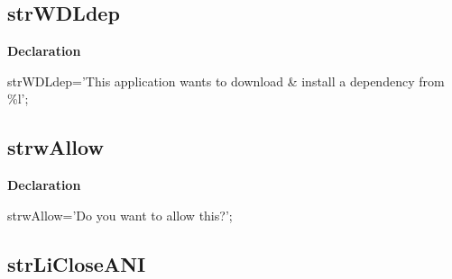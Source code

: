 \documentclass{report}
\newif\ifpdf
\begin{document}
\subsection*{strWDLdep}
\fi
\label{trstrings-strWDLdep}
\begin{list}{}{
\setlength{\itemindent}{0cm}
\setlength{\listparindent}{0cm}
\setlength{\leftmargin}{\evensidemargin}
\addtolength{\leftmargin}{\tmplength}
\settowidth{\labelsep}{X}
\addtolength{\leftmargin}{\labelsep}
\setlength{\labelwidth}{\tmplength}
}
\item[\textbf{Declaration}\hfill]
\ifpdf
\begin{flushleft}
\fi
\begin{ttfamily}
strWDLdep='This application wants to download {\&} install a dependency from {\%}l';\end{ttfamily}

\ifpdf
\end{flushleft}
\fi

\end{list}
\ifpdf
\subsection*{\large{\textbf{strwAllow}}\normalsize\hspace{1ex}\hrulefill}
\else
\subsection*{strwAllow}
\fi
\label{trstrings-strwAllow}
\begin{list}{}{
\setlength{\itemindent}{0cm}
\setlength{\listparindent}{0cm}
\setlength{\leftmargin}{\evensidemargin}
\addtolength{\leftmargin}{\tmplength}
\settowidth{\labelsep}{X}
\addtolength{\leftmargin}{\labelsep}
\setlength{\labelwidth}{\tmplength}
}
\item[\textbf{Declaration}\hfill]
\ifpdf
\begin{flushleft}
\fi
\begin{ttfamily}
strwAllow='Do you want to allow this?';\end{ttfamily}

\ifpdf
\end{flushleft}
\fi

\end{list}
\ifpdf
\subsection*{\large{\textbf{strLiCloseANI}}\normalsize\hspace{1ex}\hrulefill}
\else
\end{document}
